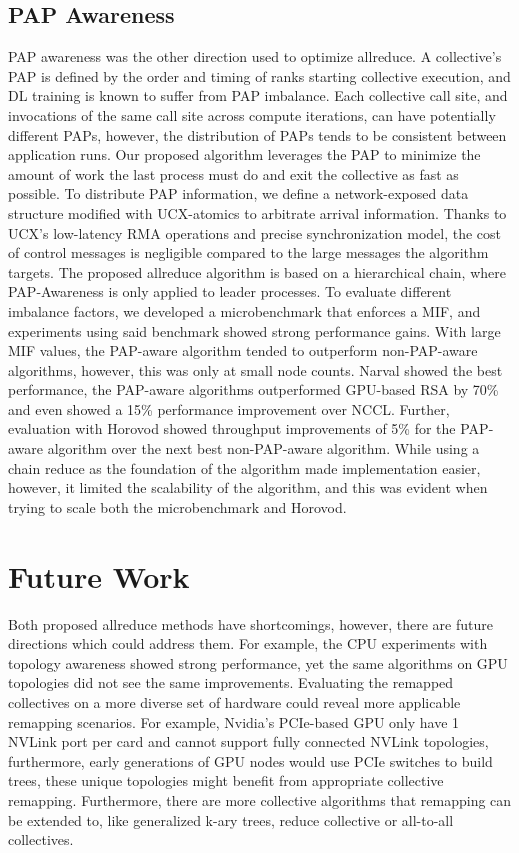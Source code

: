 \subsection{PAP Awareness}
\gls{PAP} awareness was the other direction used to optimize allreduce.
A collective's \gls{PAP} is defined by the order and timing of ranks starting collective execution, and \gls{DL} training is known to suffer from \gls{PAP} imbalance.
Each collective call site, and invocations of the same call site across compute iterations, can have potentially different \gls{PAP}s, however, the distribution of \gls{PAP}s tends to be consistent between application runs.
Our proposed algorithm leverages the \gls{PAP} to minimize the amount of work the last process must do and exit the collective as fast as possible.
To distribute \gls{PAP} information, we define a network-exposed data structure modified with \gls{UCX}-atomics to arbitrate arrival information.
Thanks to \gls{UCX}'s low-latency \gls{RMA} operations and precise synchronization model, the cost of control messages is negligible compared to the large messages the algorithm targets.
The proposed allreduce algorithm is based on a hierarchical chain, where \gls{PAP}-Awareness is only applied to leader processes.
To evaluate different imbalance factors, we developed a microbenchmark that enforces a \gls{MIF}, and experiments using said benchmark showed strong performance gains.
With large \gls{MIF} values, the \gls{PAP}-aware algorithm tended to outperform non-\gls{PAP}-aware algorithms, however, this was only at small node counts.
Narval showed the best performance, the \gls{PAP}-aware algorithms outperformed \gls{GPU}-based \gls{RSA} by 70\% and even showed a 15\% performance improvement over \gls{NCCL}.
Further, evaluation with Horovod showed throughput improvements of 5\% for the \gls{PAP}-aware algorithm over the next best non-\gls{PAP}-aware algorithm.
While using a chain reduce as the foundation of the algorithm made implementation easier, however, it limited the scalability of the algorithm, and this was evident when trying to scale both the microbenchmark and Horovod.

\section{Future Work}
Both proposed allreduce methods have shortcomings, however, there are future directions which could address them.
For example, the \gls{CPU} experiments with topology awareness showed strong performance, yet the same algorithms on \gls{GPU} topologies did not see the same improvements.
Evaluating the remapped collectives on a more diverse set of hardware could reveal more applicable remapping scenarios.
For example, Nvidia's \gls{PCIe}-based \gls{GPU} only have 1 NVLink port per card and cannot support fully connected NVLink topologies, furthermore, early generations of \gls{GPU} nodes would use \gls{PCIe} switches to build trees, these unique topologies might benefit from appropriate collective remapping.
Furthermore, there are more collective algorithms that remapping can be extended to, like generalized k-ary trees, reduce collective or all-to-all collectives.

